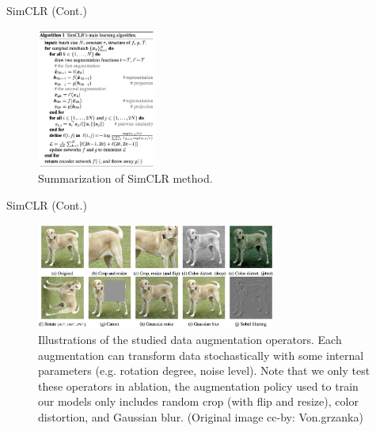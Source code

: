 \documentclass[serif, aspectratio=169]{beamer}
\begin{document}
\begin{frame}{SimCLR (Cont.)}
    \begin{figure}
        \setlength{\abovecaptionskip}{0pt}
        \setlength{\belowcaptionskip}{1pt}
        \centering
        \includegraphics[width=0.35\textwidth]{pic/simclr/5.png}
        \caption{Summarization of SimCLR method.}
   \end{figure}
\end{frame}


\begin{frame}{SimCLR (Cont.)}
    \begin{figure}
        \setlength{\abovecaptionskip}{0pt}
        \setlength{\belowcaptionskip}{1pt}
        \centering
        \includegraphics[width=0.7\textwidth]{pic/simclr/6.png}
        \caption{Illustrations of the studied data augmentation operators. Each augmentation can transform data stochastically with some internal parameters (e.g. rotation degree, noise level). Note that we only test these operators in ablation, the augmentation policy used to train our models only includes random crop (with flip and resize), color distortion, and Gaussian blur. (Original image cc-by: Von.grzanka)}
   \end{figure}
\end{frame}
\end{document}
